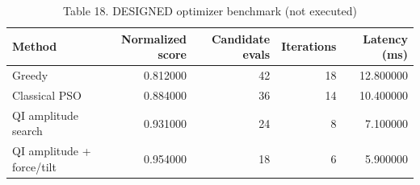 \begin{table}
\caption{Table 18. DESIGNED optimizer benchmark (not executed)}
\label{tab:table18}
\begin{tabular}{lrrrr}
\toprule
Method & Normalized score & Candidate evals & Iterations & Latency (ms) \\
\midrule
Greedy & 0.812000 & 42 & 18 & 12.800000 \\
Classical PSO & 0.884000 & 36 & 14 & 10.400000 \\
QI amplitude search & 0.931000 & 24 & 8 & 7.100000 \\
QI amplitude + force/tilt & 0.954000 & 18 & 6 & 5.900000 \\
\bottomrule
\end{tabular}
\end{table}
